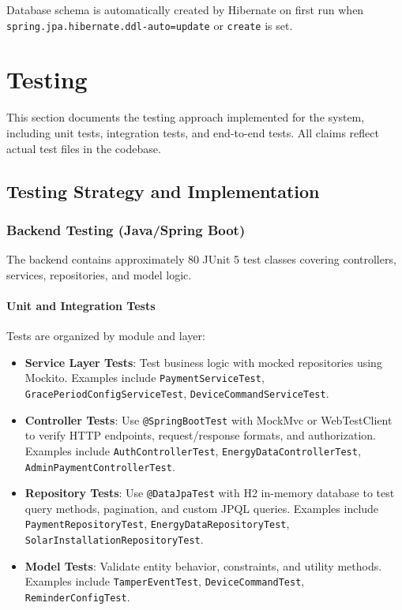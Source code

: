 Database schema is automatically created by Hibernate on first run when \texttt{spring.jpa.hibernate.ddl-auto=update} or \texttt{create} is set.

\section{Testing}
\label{sec:testing}

This section documents the testing approach implemented for the system, including unit tests, integration tests, and end-to-end tests. All claims reflect actual test files in the codebase.

\subsection{Testing Strategy and Implementation}
\label{subsec:test-plans}

\subsubsection{Backend Testing (Java/Spring Boot)}
\label{subsubsec:unit-testing}

The backend contains approximately 80 JUnit 5 test classes covering controllers, services, repositories, and model logic.

\paragraph{Unit and Integration Tests}
Tests are organized by module and layer:
\begin{itemize}
    \item \textbf{Service Layer Tests}: Test business logic with mocked repositories using Mockito. Examples include \texttt{PaymentServiceTest}, \texttt{GracePeriodConfigServiceTest}, \texttt{DeviceCommandServiceTest}.
    \item \textbf{Controller Tests}: Use \texttt{@SpringBootTest} with MockMvc or WebTestClient to verify HTTP endpoints, request/response formats, and authorization. Examples include \texttt{AuthControllerTest}, \texttt{EnergyDataControllerTest}, \texttt{AdminPaymentControllerTest}.
    \item \textbf{Repository Tests}: Use \texttt{@DataJpaTest} with H2 in-memory database to test query methods, pagination, and custom JPQL queries. Examples include \texttt{PaymentRepositoryTest}, \texttt{EnergyDataRepositoryTest}, \texttt{SolarInstallationRepositoryTest}.
    \item \textbf{Model Tests}: Validate entity behavior, constraints, and utility methods. Examples include \texttt{TamperEventTest}, \texttt{DeviceCommandTest}, \texttt{ReminderConfigTest}.
\end{itemize}

